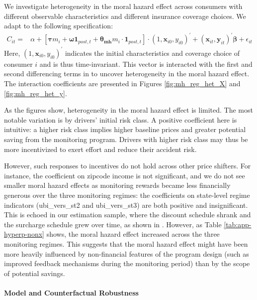 We investigate heterogeneity in the moral hazard effect across consumers with different observable characteristics and different insurance coverage choices. We adapt  to the following specification:
\begin{align}
C_{it}= &
\alpha+\left[ \mathbf{\tau} m_{i}+ \mathbf{\omega}\mathbf{1}_{post,t} +
\mathbf{\theta_{mh}} m_{i}\cdot\mathbf{1}_{post,t} \right] \cdot (1,\mathbf{x}_{i0},y_{i0})^\prime +
(\mathbf{x}_{it},\mathbf{y}_{it})^{\prime}\mathbf{\beta} + \epsilon_{it}\label{eq:mh_reg_het}
\end{align}
Here, $(1,\mathbf{x}_{i0},y_{i0})^\prime$ indicates the initial characteristics and coverage choice of consumer $i$ and is thus time-invariant. This vector is interacted with the first and second differencing terms in   to uncover heterogeneity in the moral hazard effect. The interaction coefficients are presented in Figures \ref{fig:mh_reg_het_X} and \ref{fig:mh_reg_het_y}.

As the figures show, heterogeneity in the moral hazard effect is limited. The most notable variation is by drivers' initial risk class.
A positive coefficient here is intuitive: a higher risk class implies higher baseline prices and greater potential saving from the monitoring program. Drivers with higher risk class may thus be more incentivized to exert effort and reduce their accident risk.

However, such responses to incentives do not hold across other price shifters. For instance, the coefficient on zipcode income is not significant, and we do not see smaller moral hazard effects as monitoring rewards became less financially generous over the three monitoring regimes: the coefficients on state-level regime indicators (ubi\_vers\_st2 and ubi\_vers\_st3) are both positive and insignificant. This is echoed in our estimation sample, where the discount schedule shrank and the surcharge schedule grew over time, as shown in . However, as Table \ref{tab:app-hyperp-nonx} shows, the moral hazard effect increased across the three monitoring regimes. This suggests that the moral hazard effect might have been more heavily influenced by non-financial features of the program design (such as improved feedback mechanisms during the monitoring period) than by the scope of potential savings.

\paragraph{Model and Counterfactual Robustness}

